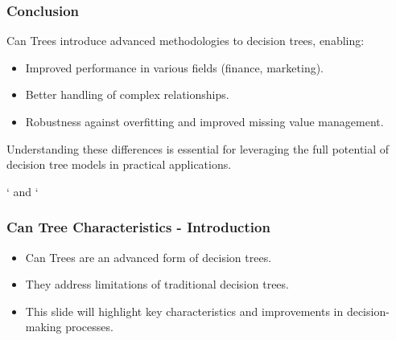 \documentclass[aspectratio=169]{beamer}
\begin{document}
\begin{frame}[fragile]
    \frametitle{Conclusion}
    Can Trees introduce advanced methodologies to decision trees, enabling:
    \begin{itemize}
        \item Improved performance in various fields (finance, marketing).
        \item Better handling of complex relationships.
        \item Robustness against overfitting and improved missing value management.
    \end{itemize}
    Understanding these differences is essential for leveraging the full potential of decision tree models in practical applications.
\end{frame}

\begin{frame}[fragile]` and `\end{frame}

\begin{frame}[fragile]
    \frametitle{Can Tree Characteristics - Introduction}
    \begin{itemize}
        \item Can Trees are an advanced form of decision trees.
        \item They address limitations of traditional decision trees.
        \item This slide will highlight key characteristics and improvements in decision-making processes.
    \end{itemize}
\end{frame}
\end{document}
